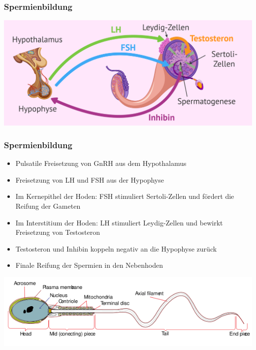 \documentclass{beamer}
\begin{document}
\begin{frame}
\frametitle{Spermienbildung}


\begin{center}
\includegraphics[width=\textwidth]{hormonelle-regulierung-spermatogenese.png}

\end{center}


\end{frame}



\begin{frame}
\frametitle{Spermienbildung}

\begin{itemize}
\item
Pulsatile Freisetzung von GnRH aus dem Hypothalamus
\item
Freisetzung von LH und FSH aus der Hypophyse
\pause
\item
Im Kernepithel der Hoden: FSH stimuliert Sertoli-Zellen und fördert die Reifung der Gameten
\item
Im Interstitium der Hoden: LH stimuliert Leydig-Zellen und bewirkt Freisetzung von Testosteron
\pause
\item
Testosteron und Inhibin koppeln negativ an die Hypophyse zurück
\pause
\item
Finale Reifung der Spermien in den Nebenhoden

\end{itemize}

\pause

\begin{center}
\includegraphics[width=\textwidth]{spermium.png}
\end{center}


\end{frame}
\end{document}

